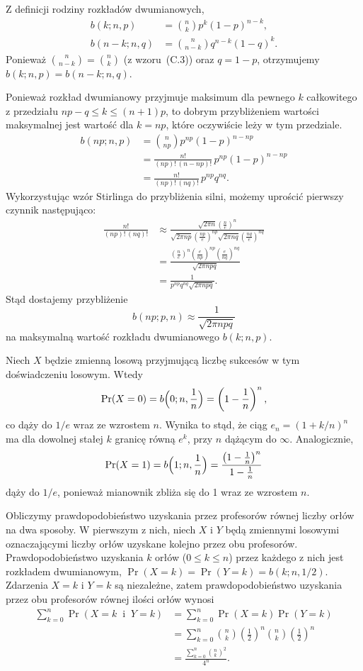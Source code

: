 \exercise{} %
\noindent Z definicji rodziny rozkładów dwumianowych,
\begin{align*}
	b(k;n,p) &= \binom{n}{k}p^k(1-p)^{n-k}, \\
	b(n-k;n,q) &= \binom{n}{n-k}q^{n-k}(1-q)^k.
\end{align*}
Ponieważ $\binom{n}{n-k}=\binom{n}{k}$ (z wzoru~(C.3)) oraz $q=1-p$, otrzymujemy $b(k;n,p)=b(n-k;n,q)$.

\exercise{} %
\noindent Ponieważ rozkład dwumianowy przyjmuje maksimum dla pewnego $k$ całkowitego z przedziału $np-q\le k\le(n+1)p$, to dobrym przybliżeniem wartości maksymalnej jest wartość dla $k=np$, które oczywiście leży w tym przedziale.
\begin{align*}
	b(np;n,p) &= \binom{n}{np}p^{np}(1-p)^{n-np} \\
	&= \frac{n!}{(np)!\,(n-np)!}\,p^{np}(1-p)^{n-np} \\
	&= \frac{n!}{(np)!\,(nq)!}\,p^{np}q^{nq}.
\end{align*}
Wykorzystując wzór Stirlinga do przybliżenia silni, możemy uprościć pierwszy czynnik następująco:
\begin{align*}
	\frac{n!}{(np)!\,(nq)!} &\approx \frac{\sqrt{2\pi n}\left(\frac{n}{e}\right)^n}{\sqrt{2\pi np}\left(\frac{np}{e}\right)^{np}\sqrt{2\pi nq}\left(\frac{nq}{e}\right)^{nq}} \\[1mm]
	&= \frac{\left(\frac{n}{e}\right)^n\left(\frac{e}{np}\right)^{np}\left(\frac{e}{nq}\right)^{nq}}{\sqrt{2\pi npq}} \\[1mm]
	&= \frac{1}{p^{np}q^{nq}\sqrt{2\pi npq}}.
\end{align*}
Stąd dostajemy przybliżenie
\[
	b(np;p,n) \approx \frac{1}{\sqrt{2\pi npq}}
\]
na maksymalną wartość rozkładu dwumianowego $b(k;n,p)$.

\exercise{} %
\noindent Niech $X$ będzie zmienną losową przyjmującą liczbę sukcesów w tym doświadczeniu losowym. Wtedy
\[
	\Pr(X=0) = b\Bigl(0;n,\frac{1}{n}\Bigr) = \left(1-\frac{1}{n}\right)^n,
\]
co dąży do $1/e$ wraz ze wzrostem $n$. Wynika to stąd, że ciąg $e_n={(1+k/n)}^n$ ma dla dowolnej stałej $k$ granicę równą $e^k$, przy $n$ dążącym do $\infty$.
Analogicznie,
\[
	\Pr(X=1) = b\Bigl(1;n,\frac{1}{n}\Bigr) = \frac{\left(1-\frac{1}{n}\right)^n}{1-\frac{1}{n}}
\]
dąży do $1/e$, ponieważ mianownik zbliża się do 1 wraz ze wzrostem $n$.

\exercise{} %
\noindent Obliczymy prawdopodobieństwo uzyskania przez profesorów równej liczby orłów na dwa sposoby. W pierwszym z nich, niech $X$ i $Y$ będą zmiennymi losowymi oznaczającymi liczby orłów uzyskane kolejno przez obu profesorów. Prawdopodobieństwo uzyskania $k$ orłów ($0\le k\le n$) przez każdego z nich jest rozkładem dwumianowym, $\Pr(X=k)=\Pr(Y=k)=b(k;n,1/2)$. Zdarzenia $X=k$ i $Y=k$ są niezależne, zatem prawdopodobieństwo uzyskania przez obu profesorów równej ilości orłów wynosi
\begin{align*}
	\sum_{k=0}^n\Pr(X=k\;\;\text{i}\;\;Y=k) &= \sum_{k=0}^n\Pr(X=k)\Pr(Y=k) \\
	&= \sum_{k=0}^n\binom{n}{k}\left(\frac{1}{2}\right)^n\binom{n}{k}\left(\frac{1}{2}\right)^n \\
	&= \frac{\sum_{k=0}^n\binom{n}{k}^2}{4^n}.
\end{align*}

